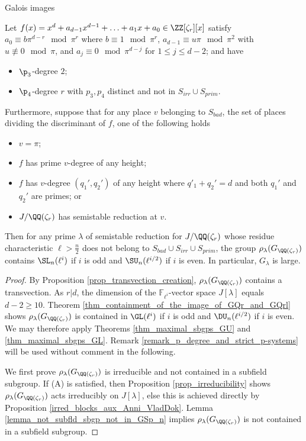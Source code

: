 \documentclass[11pt,a4paper]{article}
\newcommand{\Fli}{\mathbb{F}_{\ell^i}}
\newcommand{\Qr}{{\QQ(\zeta_r)}}
\newcommand{\Zr}{{\ZZ[\zeta_r]}}
\newcommand{\GQr}{G_{\QQ(\zeta_{r})}}
\newcommand{\Glam}{G_{\lambda}}
\begin{document}
\begin{section}{Galois images}
\begin{theorem}
Let $f(x) = x^d + a_{d-1}x^{d-1} + \ldots + a_1x+a_0 \in \Zr[x]$ satisfy  $a_0\equiv b\pi^{d-r} \mod{\pi^{r}}$ where $b \equiv 1 \mod{\pi^r}$, $a_{d-1} \equiv u\pi\mod{\pi^2}$ with $u \not \equiv 0 \mod{\pi}$, and $a_{j} \equiv 0\mod{\pi^{d-j}} $ for $1\leq j \leq d-2 $; and have
\begin{itemize}
    \item $\p_3$-degree $2$;
    \item $\p_4$-degree $r$
    with $p_3,p_4$ distinct and not in $ S_{irr} \cup S_{prim}$.
\end{itemize}
Furthermore, suppose that for any place $v$ belonging to $S_{bad}$, the set of places dividing the discriminant of $f$, one of the following holds
\begin{itemize}
    \item $v=\pi$;
    \item $f$ has prime $v$-degree of any height;
    \item $f$ has $v$-degree $(q_1',q_2')$ of any height where $q'_1+q_2' =d$ and both $q_1'$ and $q_2'$ are primes; or
    \item $J/\Qr$ has semistable reduction at $v$.
\end{itemize}

Then for any prime $\lambda$ of semistable reduction for $J/\Qr$ whose residue characteristic $\ell> \frac{n}{2}$ does not belong to $S_{bad} \cup S_{irr} \cup S_{prim}$, the group $\rho_\lambda(\GQr)$ contains $\SL_n(\ell^i)$ if $i$ is odd and $\SU_n(\ell^{i/2})$ if $i$ is even.
In particular, $\Glam$ is large. 
\end{theorem}



\begin{proof}

By Proposition \ref{prop_transvection_creation}, $\rho_\lambda(\GQr)$ contains a transvection.
As $r|d$, the dimension of the $\Fli$-vector space $J[\lambda]$ equals $d-2 \geq 10$.
Theorem \ref{thm_containment_of_the_image_of_GQr_and_GQrl} shows $\rho_\lambda(\GQr)$ is contained in $\GL(\ell^i)$ if $i$ is odd and $\DU_n(\ell^{i/2})$ if $i$ is even.
We may therefore apply Theorems \ref{thm_maximal_sbgps_GU} and \ref{thm_maximal_sbgps_GL}.
Remark \ref{remark_p_degree_and_strict_p-systems} will be used without comment in the following.

We first prove $\rho_\lambda(\GQr)$ is irreducible and not contained in a subfield subgroup.
If (A) is satisfied, then Proposition \ref{prop_irreducibility} shows $\rho_\lambda(\GQr)$ acts irreducibly on $J[\lambda]$, else this is achieved directly by Proposition \ref{irred_blocks_aux_Anni_VladDok}.
Lemma \ref{lemma_not_subfld_sbgp_not_in_GSp_n} implies $\rho_\lambda(\GQr)$ is not contained in a subfield subgroup.


\end{proof}
\end{section}
\end{document}
